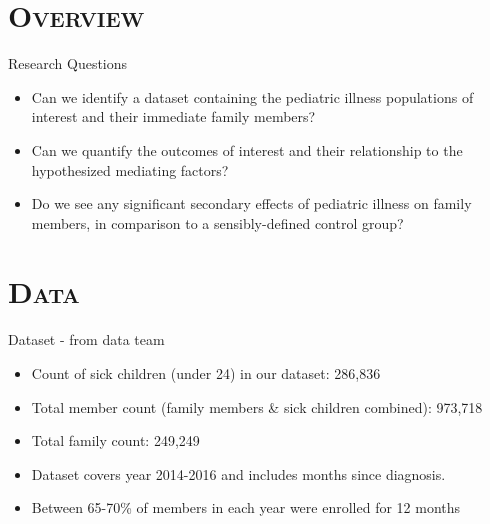 \documentclass[xcolor=x11names,compress]{beamer}
\renewcommand{\(}{\begin{columns}}
\renewcommand{\)}{\end{columns}}
\newcommand{\<}[1]{\begin{column}{#1}}
\renewcommand{\>}{\end{column}}
\begin{document}


\section{\scshape Overview}

\begin{frame}{Research Questions}
\begin{itemize}
	\item Can we identify a dataset containing the pediatric illness populations of interest and their immediate family members? 
	\item Can we quantify the outcomes of interest and their relationship to the hypothesized mediating factors? 
	\item Do we see any significant secondary effects of pediatric illness on family members, in comparison to a sensibly-defined control group? 
\end{itemize}
\end{frame}

\section{\scshape Data}

\begin{frame}{Dataset - from data team}
\begin{itemize}
	\item Count of sick children (under 24) in our dataset:  286,836
	\item Total member count (family members \& sick children combined): 973,718
	\item Total family count: 249,249
	\item Dataset covers year 2014-2016 and includes months since diagnosis. 
	\item Between 65-70\% of members in each year were enrolled for 12 months
\end{itemize}
\end{frame}
\end{document}
